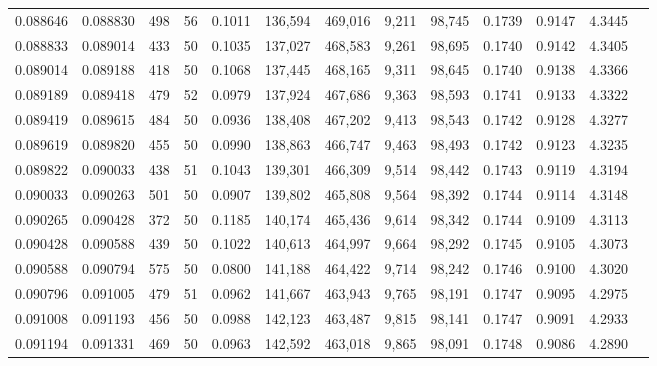 \begin{tabular}{rrrrrrrrrrrrr}
0.088646 & 0.088830 &   498 &  56 &                                     0.1011 & 136,594 & 469,016 &   9,211 &  98,745 & 0.1739 & 0.9147 & 4.3445 \\
0.088833 & 0.089014 &   433 &  50 &                                     0.1035 & 137,027 & 468,583 &   9,261 &  98,695 & 0.1740 & 0.9142 & 4.3405 \\
0.089014 & 0.089188 &   418 &  50 &                                     0.1068 & 137,445 & 468,165 &   9,311 &  98,645 & 0.1740 & 0.9138 & 4.3366 \\
0.089189 & 0.089418 &   479 &  52 &                                     0.0979 & 137,924 & 467,686 &   9,363 &  98,593 & 0.1741 & 0.9133 & 4.3322 \\
0.089419 & 0.089615 &   484 &  50 &                                     0.0936 & 138,408 & 467,202 &   9,413 &  98,543 & 0.1742 & 0.9128 & 4.3277 \\
0.089619 & 0.089820 &   455 &  50 &                                     0.0990 & 138,863 & 466,747 &   9,463 &  98,493 & 0.1742 & 0.9123 & 4.3235 \\
0.089822 & 0.090033 &   438 &  51 &                                     0.1043 & 139,301 & 466,309 &   9,514 &  98,442 & 0.1743 & 0.9119 & 4.3194 \\
0.090033 & 0.090263 &   501 &  50 &                                     0.0907 & 139,802 & 465,808 &   9,564 &  98,392 & 0.1744 & 0.9114 & 4.3148 \\
0.090265 & 0.090428 &   372 &  50 &                                     0.1185 & 140,174 & 465,436 &   9,614 &  98,342 & 0.1744 & 0.9109 & 4.3113 \\
0.090428 & 0.090588 &   439 &  50 &                                     0.1022 & 140,613 & 464,997 &   9,664 &  98,292 & 0.1745 & 0.9105 & 4.3073 \\
0.090588 & 0.090794 &   575 &  50 &                                     0.0800 & 141,188 & 464,422 &   9,714 &  98,242 & 0.1746 & 0.9100 & 4.3020 \\
0.090796 & 0.091005 &   479 &  51 &                                     0.0962 & 141,667 & 463,943 &   9,765 &  98,191 & 0.1747 & 0.9095 & 4.2975 \\
0.091008 & 0.091193 &   456 &  50 &                                     0.0988 & 142,123 & 463,487 &   9,815 &  98,141 & 0.1747 & 0.9091 & 4.2933 \\
0.091194 & 0.091331 &   469 &  50 &                                     0.0963 & 142,592 & 463,018 &   9,865 &  98,091 & 0.1748 & 0.9086 & 4.2890 \\

\end{tabular}
